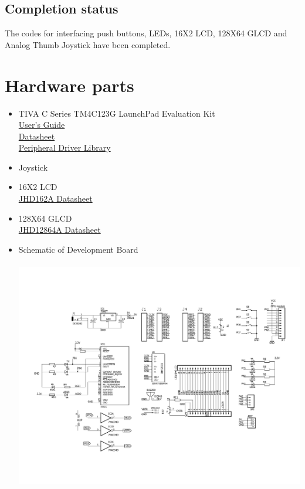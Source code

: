 \documentclass[a4paper,12pt,oneside]{book}
\begin{document}
\subsection*{Completion status}
The codes for interfacing push buttons, LEDs, 16X2 LCD, 128X64 GLCD and Analog Thumb Joystick have been completed.

\section{Hardware parts}
\begin{itemize}
  \item TIVA C Series TM4C123G LaunchPad Evaluation Kit\\
  \href{http://www.ti.com/lit/ug/spmu296/spmu296.pdf}{User's Guide}\\
  \href{http://www.ti.com.cn/cn/lit/ds/symlink/tm4c123gh6pm.pdf}{Datasheet}\\
  \href{http://www.ti.com/lit/ug/spmu298a/spmu298a.pdf}{Peripheral Driver Library}
  \item Joystick
  \item 16X2 LCD \\
  \href{http://www.agspecinfo.com/pdfs/J/JHD162A.PDF}{JHD162A Datasheet}\\
  \item 128X64 GLCD\\
  \href{http://www.agspecinfo.com/pdfs/J/JHD12864.PDF}{JHD12864A Datasheet}\\
  \item Schematic of Development Board\\~\\
  \includegraphics[scale = 0.4]{Gameconsol.pdf}
\end{itemize}
\end{document}
